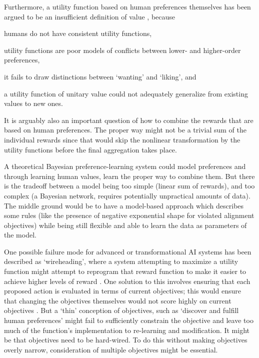 Furthermore, a utility function based on human preferences themselves has been argued to be an insufficient definition of value \cite{sotala2016defining, DBLP:journals/corr/abs-1712-05812}, because \begin{enumerate*}
    \item humans do not have consistent utility functions,
    \item utility functions are poor models of conflicts between lower- and higher-order preferences,
    \item it fails to draw distinctions between `wanting' and `liking', and
    \item a utility function of unitary value could not adequately generalize from existing values to new ones.
\end{enumerate*}
It is arguably also an important question of how to combine the rewards that are based on human preferences. The proper way might not be a trivial sum of the individual rewards since that would skip the nonlinear transformation by the utility functions before the final aggregation takes place. 

A theoretical Bayesian preference-learning system could model preferences and through learning human values, learn the proper way to combine them. But there is the tradeoff between a model being too simple (linear sum of rewards), and too complex (a Bayesian network, requires potentially unpractical amounts of data). The middle ground would be to have a model-based approach which describes some rules (like the presence of negative exponential shape for violated alignment objectives) while being still flexible and able to learn the data as parameters of the model.

One possible failure mode for advanced or transformational AI systems has been described as `wireheading', where a system attempting to maximize a utility function might attempt to reprogram that reward function to make it easier to achieve higher levels of reward \cite{demski_a_stable_2017}. One solution to this involves ensuring that each proposed action is evaluated in terms of current objectives; this would ensure that changing the objectives themselves would not score highly on current objectives \cite{dewey_learning_2011}. But a `thin' conception of objectives, such as `discover and fulfill human preferences' might fail to sufficiently constrain the objective and leave too much of the function's implementation to re-learning and modification. It might be that objectives need to be hard-wired. To do this without making objectives overly narrow, consideration of multiple objectives might be essential.



